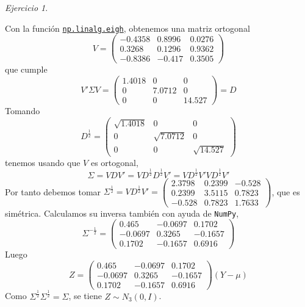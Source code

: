 \documentclass[12pt,spanish]{article}
\theoremstyle{definition}
\theoremstyle{remark}
\newtheorem{exercise}{Ejercicio}
\begin{document}
\begin{exercise}
\begin{enumerate}[a)]
      Con la función
      \href{https://numpy.org/doc/stable/reference/generated/numpy.linalg.eigh.html}{\texttt{np.linalg.eigh}},
      obtenemos una matriz ortogonal
      \[V=
        \begin{pmatrix}
          -0.4358 & 0.8996 & 0.0276 \\
          0.3268 & 0.1296 & 0.9362 \\
          -0.8386 & -0.417 & 0.3505
        \end{pmatrix}
      \] que cumple \[V'\Sigma V=
        \begin{pmatrix}
          1.4018 & 0 & 0 \\
          0 & 7.0712 & 0 \\
          0 & 0 & 14.527
        \end{pmatrix}=D\]
      Tomando \[D^\frac{1}{2}=
      \begin{pmatrix}
          \sqrt{1.4018} & 0 & 0 \\
          0 & \sqrt{7.0712} & 0 \\
          0 & 0 & \sqrt{14.527}
        \end{pmatrix}\]
      tenemos usando que $V$ es ortogonal,
      \[\Sigma=VDV'=VD^\frac{1}{2}D^\frac{1}{2}V'=VD^\frac{1}{2}V'VD^\frac{1}{2}V'\]
      Por tanto debemos tomar $\Sigma^\frac{1}{2}=VD^\frac{1}{2}V'=
      \begin{pmatrix}
        2.3798 & 0.2399 & -0.528 \\
        0.2399 & 3.5115 & 0.7823 \\
        -0.528 & 0.7823 & 1.7633
      \end{pmatrix}$, que es simétrica. Calculamos su inversa también
      con ayuda de \texttt{NumPy},
      \[\Sigma^{-\frac{1}{2}}=
        \begin{pmatrix}
          0.465 & -0.0697 & 0.1702 \\
          -0.0697 & 0.3265 & -0.1657 \\
          0.1702 & -0.1657 & 0.6916
        \end{pmatrix}\]
        Luego \[Z=\begin{pmatrix}
          0.465 & -0.0697 & 0.1702 \\
          -0.0697 & 0.3265 & -0.1657 \\
          0.1702 & -0.1657 & 0.6916
        \end{pmatrix}\left(Y-\mu\right)\]
      Como $\Sigma^\frac{1}{2}\Sigma^\frac{1}{2}=\Sigma$, se tiene $Z\sim N_3(0,I)$.
    \end{enumerate}
    
\end{exercise}
\end{document}
